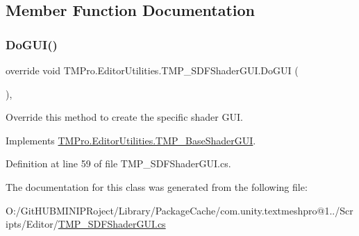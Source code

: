 \subsection{Member Function Documentation}
\mbox{\label{class_t_m_pro_1_1_editor_utilities_1_1_t_m_p___s_d_f_shader_g_u_i_ad54675b667fc314961cedb1beeacd6b4}} 
\subsubsection{\texorpdfstring{DoGUI()}{DoGUI()}}
{\footnotesize\ttfamily override void T\+M\+Pro.\+Editor\+Utilities.\+T\+M\+P\+\_\+\+S\+D\+F\+Shader\+G\+U\+I.\+Do\+G\+UI (\begin{DoxyParamCaption}{ }\end{DoxyParamCaption})\hspace{0.3cm}{\ttfamily [protected]}, {\ttfamily [virtual]}}



Override this method to create the specific shader G\+UI. 



Implements \mbox{\hyperlink{class_t_m_pro_1_1_editor_utilities_1_1_t_m_p___base_shader_g_u_i_a04c57cff2c8f6cf93b5bf50209ef9f5f}{T\+M\+Pro.\+Editor\+Utilities.\+T\+M\+P\+\_\+\+Base\+Shader\+G\+UI}}.



Definition at line 59 of file T\+M\+P\+\_\+\+S\+D\+F\+Shader\+G\+U\+I.\+cs.



The documentation for this class was generated from the following file\+:\begin{DoxyCompactItemize}
\item 
O\+:/\+Git\+H\+U\+B\+M\+I\+N\+I\+P\+Roject/\+Library/\+Package\+Cache/com.\+unity.\+textmeshpro@1../\+Scripts/\+Editor/\mbox{\hyperlink{_t_m_p___s_d_f_shader_g_u_i_8cs}{T\+M\+P\+\_\+\+S\+D\+F\+Shader\+G\+U\+I.\+cs}}\end{DoxyCompactItemize}
